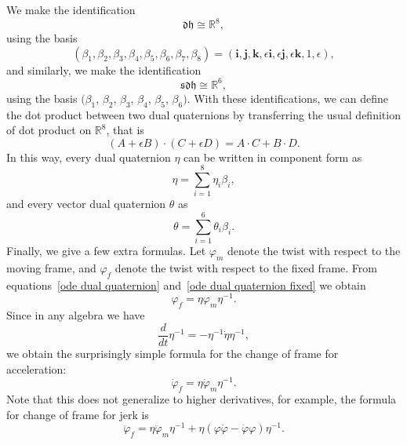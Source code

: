 \documentclass[reqno,12pt]{amsart}
\newcommand\bi{\bm i}
\newcommand\bj{\bm j}
\newcommand\bk{\bm k}
\newcommand\setdualquat{\mathfrak d \mathfrak h}
\newcommand\setvectordualquat{\mathfrak{s}\mathfrak d \mathfrak h}
\begin{document}
We make the identification
\begin{equation}
\setdualquat \cong \mathbb R^8,
\end{equation}
using the basis
\begin{equation}
\label{dual quaternion basis}
(\beta_1, \beta_2, \beta_3, \beta_4, \beta_5, \beta_6, \beta_7, \beta_8) = (\bi, \bj, \bk, \epsilon\bi, \epsilon\bj, \epsilon\bk, 1, \epsilon),
\end{equation}
and similarly, we make the identification
\begin{equation}
\label{vectdualquat ident}
\setvectordualquat \cong \mathbb R^6,
\end{equation}
using the basis $(\beta_1$, $\beta_2$, $\beta_3$, $\beta_4$, $\beta_5$, $\beta_6)$.  With these identifications, we can define the dot product between two dual quaternions by transferring the usual definition of dot product on $\mathbb R^8$, that is
\begin{equation}
(A + \epsilon B) \cdot (C + \epsilon D) = A \cdot C + B \cdot D.
\end{equation}
In this way, every dual quaternion $\eta$ can be written in component form as
\begin{equation}
\eta = \sum_{i=1}^8 \eta_i \beta_i ,
\end{equation}
and every vector dual quaternion $\theta$ as
\begin{equation}
\theta = \sum_{i=1}^6 \theta_i \beta_i .
\end{equation}
Finally, we give a few extra formulas.  Let $\varphi_m$ denote the twist with respect to the moving frame, and $\varphi_f$ denote the twist with respect to the fixed frame.  From
equations~\eqref{ode dual quaternion} and~\eqref{ode dual quaternion fixed} we obtain
\begin{equation}
\varphi_f = \eta \varphi_m \eta^{-1} .
\end{equation}
Since in any algebra we have
\begin{equation}
\frac d{dt} \eta^{-1}  = - \eta^{-1} \dot \eta \eta^{-1},
\end{equation}
we obtain the surprisingly simple formula for the change of frame for acceleration:
\begin{equation}
\dot\varphi_f = \eta \dot\varphi_m \eta^{-1} .
\end{equation}
Note that this does not generalize to higher derivatives, for example, the formula for change of frame for jerk is
\begin{equation}
\ddot\varphi_f = \eta \ddot\varphi_m \eta^{-1} + \eta(\varphi\dot\varphi - \dot\varphi \varphi)\eta^{-1}.
\end{equation}
\end{document}
